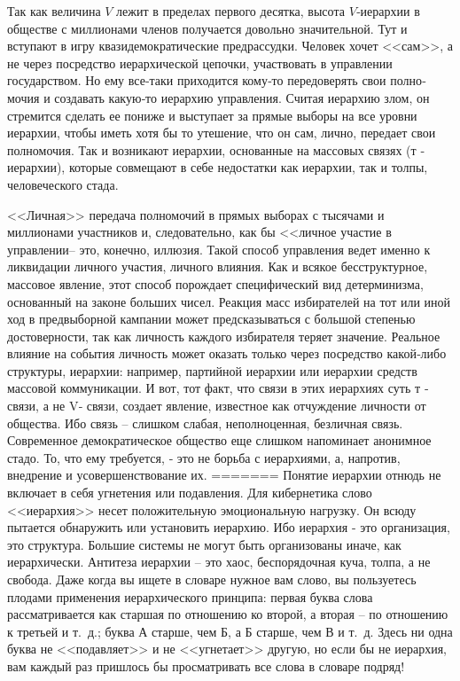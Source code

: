 \documentclass{book}
\begin{document}
Так как величина $V$  лежит в пределах первого десятка, высо­та $V$‑иерархии в обществе с миллионами членов получается до­вольно значительной. Тут и вступают в игру квазидемократические предрассудки. Человек хочет <<сам>>, а не через посредство иерархической цепочки, участвовать в управлении государством. Но ему все‑таки приходится кому‑то передоверять свои полно­мочия и создавать какую‑то иерархию управления. Считая иерар­хию злом, он стремится сделать ее пониже и выступает за пря­мые выборы на все уровни иерархии, чтобы иметь хотя бы то утешение, что он сам, лично,  передает свои полномочия. Так и возникают иерархии, основанные на массовых связях (т ‑  иерархии), которые совмещают в себе недостатки как иерархии, так и толпы, человеческого стада.

<<Личная>> передача полномочий в прямых выборах с тысячами и миллионами участников и, следовательно, как бы <<личное уча­стие в управлении-- это, конечно, иллюзия. Такой способ управле­ния ведет именно к ликвидации личного участия, личного влия­ния. Как и всякое бесструктурное, массовое явление, этот спо­соб порождает специфический вид детерминизма, основанный на законе больших чисел. Реакция масс избирателей на тот или иной ход в предвыборной кампании может предсказываться с большой степенью достоверности, так как личность каждо­го избирателя теряет значение. Реальное влияние на события личность может оказать только через посредство какой‑либо структуры, иерархии: например, партийной иерархии или иерар­хии средств массовой коммуникации. И вот, тот факт, что связи в этих иерархиях суть т ‑  связи, а не V‑  связи, создает явление, известное как отчуждение  личности от общества. Ибо связь -- слишком слабая, неполноценная, безличная связь. Современное демократическое общество еще слишком напоминает аноним­ное стадо.  То, что ему требуется, ‑ это не борьба с иерархиями, а, напротив, внедрение и усовершенствование их.
=======
Понятие иерархии отнюдь не включает в себя угнетения или по­давления. Для кибернетика слово <<иерархия>> несет положитель­ную эмоциональную нагрузку. Он всюду пытается обнаружить или установить иерархию. Ибо иерархия - это организация, это структура. Большие системы не могут быть организованы иначе, как иерархически. Антитеза иерархии -- это хаос, беспорядочная куча, толпа, а не свобода. Даже когда вы ищете в словаре нужное вам слово, вы пользуетесь плодами применения иерархического принципа: первая буква слова рассматривается как старшая по отношению ко второй, а вторая -- по отношению к третьей и т.~д.; буква А старше, чем Б, а Б старше, чем В и т.~д. Здесь ни одна буква не <<подавляет>> и не <<угнетает>> другую, но если бы не ие­рархия, вам каждый раз пришлось бы просматривать все слова в словаре подряд!
\end{document}
